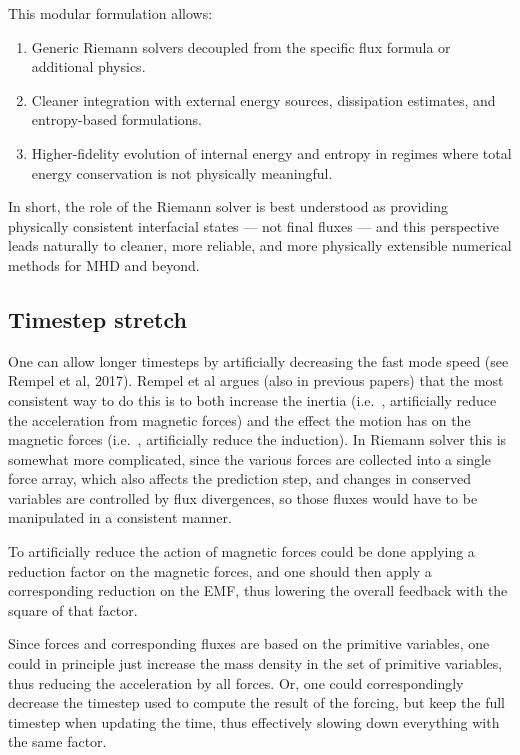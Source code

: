 \documentclass[paper=a4,fontsize=11pt]{scrartcl}
\numberwithin{equation}{section}		%
\numberwithin{figure}{section}			%
\numberwithin{table}{section}				%
\def\ie{i.e.\ }
\begin{document}
This modular formulation allows:
\begin{enumerate}
  \item Generic Riemann solvers decoupled from the specific flux formula or additional physics.
  \item Cleaner integration with external energy sources, dissipation estimates, and entropy-based formulations.
  \item Higher-fidelity evolution of internal energy and entropy in regimes where total energy conservation is not physically meaningful.
\end{enumerate}

In short, the role of the Riemann solver is best understood as providing physically consistent interfacial states — not final fluxes — and this perspective leads naturally to cleaner, more reliable, and more physically extensible numerical methods for MHD and beyond.

\subsection{Timestep stretch}
One can allow longer timesteps by artificially decreasing the fast mode speed (see Rempel et al, 2017).  Rempel et al argues (also in previous papers) that the most consistent way to do this is to both increase the inertia (\ie, artificially reduce the acceleration from magnetic forces) and the effect the motion has on the magnetic forces (\ie, artificially reduce the induction). In Riemann solver this is somewhat more complicated, since the various forces are collected into a single force array, which also affects the prediction step, and changes in conserved variables are controlled by flux divergences, so those fluxes would have to be manipulated in a consistent manner.

To artificially reduce the action of magnetic forces could be done applying a reduction factor on the magnetic forces, and one should then apply a corresponding reduction on the EMF, thus lowering the overall feedback with the square of that factor.

Since forces and corresponding fluxes are based on the primitive variables, one could in principle just increase the mass density in the set of primitive variables, thus reducing the acceleration by all forces.  Or, one could correspondingly decrease the timestep used to compute the result of the forcing, but keep the full timestep when updating the time, thus effectively slowing down everything with the same factor.
 
\end{document}

